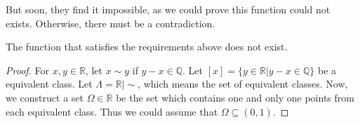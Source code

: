 But soon, they find it impossible, as we could prove this function could not exists.
Otherwise, there must be a contradiction.
\begin{theorem}
  The function that satisfies the requirements above does not exist.
\end{theorem}
\begin{proof} 
  For $x, y\in\mathbb{R}$, let $x\sim y$ if $y - x\in\mathbb{Q}$.
  Let $[x] = \{y \in \mathbb{R} | y - x \in \mathbb{Q}\}$ be a equivalent class.
  Let $\Lambda = \mathbb{R}|\sim$, which means the set of equivalent classes.
  Now, we construct a set $\Omega\in\mathbb{R}$ be the set which contains one and only one points from each equivalent class. Thus we could assume that $\Omega\subseteq(0, 1)$.


\end{proof}
